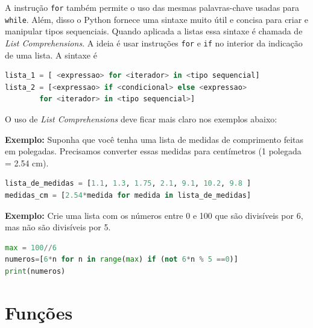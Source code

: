 A instrução {\tt for} também permite o uso das mesmas palavras-chave usadas para {\tt while}. Além, disso o Python fornece uma sintaxe muito útil e concisa para criar e manipular tipos sequenciais. Quando aplicada a listas essa sintaxe é chamada de {\it List Comprehensions}. A ideia é usar instruções {\tt for} e {\tt if} no interior da indicação de uma lista. A sintaxe é
\begin{lstlisting}[language=Python]
lista_1 = [ <expressao> for <iterador> in <tipo sequencial]
lista_2 = [<expressao> if <condicional> else <expressao> 
        for <iterador> in <tipo sequencial>]
\end{lstlisting}

O uso de {\it List Comprehensions} deve ficar mais claro nos exemplos abaixo:

{\bf Exemplo:} Suponha que você tenha uma lista de medidas de comprimento feitas em polegadas. Precisamos converter essas medidas para centímetros (1 polegada = 2.54 cm).
\begin{lstlisting}[language=Python]
lista_de_medidas = [1.1, 1.3, 1.75, 2.1, 9.1, 10.2, 9.8 ]
medidas_cm = [2.54*medida for medida in lista_de_medidas]
\end{lstlisting}

{\bf Exemplo:} Crie uma lista com os números entre 0 e 100 que são divisíveis por 6, mas não são divisíveis por 5.
\begin{lstlisting}[language=Python]
max = 100//6
numeros=[6*n for n in range(max) if (not 6*n % 5 ==0)]
print(numeros)
\end{lstlisting}

\section{Funções}

